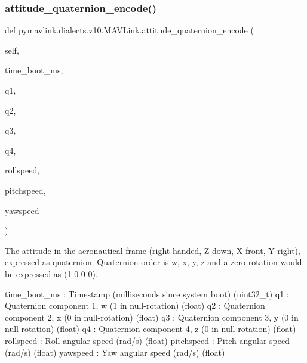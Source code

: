 \subsubsection{\texorpdfstring{attitude\+\_\+quaternion\+\_\+encode()}{attitude\_quaternion\_encode()}}
{\footnotesize\ttfamily def pymavlink.\+dialects.\+v10.\+M\+A\+V\+Link.\+attitude\+\_\+quaternion\+\_\+encode (\begin{DoxyParamCaption}\item[{}]{self,  }\item[{}]{time\+\_\+boot\+\_\+ms,  }\item[{}]{q1,  }\item[{}]{q2,  }\item[{}]{q3,  }\item[{}]{q4,  }\item[{}]{rollspeed,  }\item[{}]{pitchspeed,  }\item[{}]{yawspeed }\end{DoxyParamCaption})}

\begin{DoxyVerb}The attitude in the aeronautical frame (right-handed, Z-down, X-front,
Y-right), expressed as quaternion. Quaternion order is
w, x, y, z and a zero rotation would be expressed as
(1 0 0 0).

time_boot_ms              : Timestamp (milliseconds since system boot) (uint32_t)
q1                        : Quaternion component 1, w (1 in null-rotation) (float)
q2                        : Quaternion component 2, x (0 in null-rotation) (float)
q3                        : Quaternion component 3, y (0 in null-rotation) (float)
q4                        : Quaternion component 4, z (0 in null-rotation) (float)
rollspeed                 : Roll angular speed (rad/s) (float)
pitchspeed                : Pitch angular speed (rad/s) (float)
yawspeed                  : Yaw angular speed (rad/s) (float)\end{DoxyVerb}
 \mbox{\label{classpymavlink_1_1dialects_1_1v10_1_1MAVLink_a77236be74cab4eb1f9cb33acd52a2eba}} 
